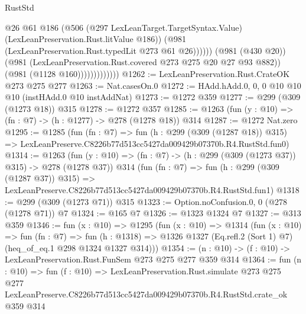 \begin{lexlean}{RustStd}
\begin{coremodule}
                                  @26
                                  @61
                                  @186
                                  (@506
                                    (@297 LexLeanTarget.TargetSyntax.Value)
                                    (LexLeanPreservation.Rust.litValue @186))
                                  (@981 (LexLeanPreservation.Rust.typedLit @273 @61 @26))))))
                          (@981 (@430 @20))
                          (@981 (LexLeanPreservation.Rust.covered @273 @275 @20 @27 @93 @882))
                          (@981 (@1128 @160)))))))))))))
@1262 := LexLeanPreservation.Rust.CrateOK @273 @275 @277
@1263 := Nat.casesOn.{0}
@1272 := HAdd.hAdd.{0, 0, 0} @10 @10 @10 (instHAdd.{0} @10 instAddNat)
@1273 := @1272 @359
@1277 := @299 (@309 (@1273 @18)) @315
@1278 := @1272 @357
@1285 := @1263 (fun (y : @10) => (fn : @7) -> (h : @1277) -> @278 (@1278 @18)) @314
@1287 := @1272 Nat.zero
@1295 := @1285
    (fun (fn : @7) =>
    fun (h : @299 (@309 (@1287 @18)) @315) =>
    LexLeanPreserve.C8226b77d513cc5427da009429b07370b.R4.RustStd.fun0)
@1314 := @1263
    (fun (y : @10) => (fn : @7) -> (h : @299 (@309 (@1273 @37)) @315) -> @278 (@1278 @37))
    @314
    (fun (fn : @7) =>
    fun (h : @299 (@309 (@1287 @37)) @315) =>
    LexLeanPreserve.C8226b77d513cc5427da009429b07370b.R4.RustStd.fun1)
@1318 := @299 (@309 (@1273 @71)) @315
@1323 := Option.noConfusion.{0, 0} (@278 (@1278 @71)) @7
@1324 := @165 @7
@1326 := @1323 @1324 @7
@1327 := @313 @359
@1346 := fun (x : @10) =>
  @1295
    (fun (x : @10) =>
    @1314
      (fun (x : @10) =>
      fun (fn : @7) =>
      fun (h : @1318) =>
      @1326 @1327 (Eq.refl.{2} (Sort 1) @7) (heq_of_eq.{1} @298 @1324 @1327 @314)))
@1354 := (n : @10) -> (f : @10) -> LexLeanPreservation.Rust.FunSem @273 @275 @277 @359 @314
@1364 := fun (n : @10) =>
  fun (f : @10) =>
  LexLeanPreservation.Rust.simulate
    @273
    @275
    @277
    LexLeanPreserve.C8226b77d513cc5427da009429b07370b.R4.RustStd.crate_ok
    @359
    @314
\end{coremodule}
\end{lexlean}
